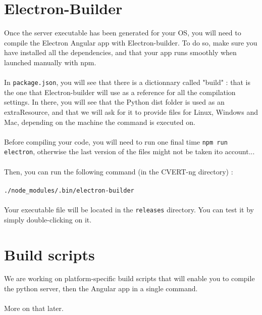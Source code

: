 \documentclass[12pt,a4paper]{article}
\begin{document}
\section{Electron-Builder}

Once the server executable has been generated for your OS, you will need to compile the Electron Angular app with Electron-builder. To do so, make sure you have installed all the dependencies, and that your app runs smoothly when launched manually with npm.\\
~\\
In \texttt{package.json}, you will see that there is a dictionnary called "build" : that is the one that Electron-builder will use as a reference for all the compilation settings. In there, you will see that the Python dist folder is used as an extraResource, and that we will ask for it to provide files for Linux, Windows and Mac, depending on the machine the command is executed on.\\
~\\
Before compiling your code, you will need to run one final time \texttt{npm run electron}, otherwise the last version of the files might not be taken ito account...\\
~\\
Then, you can run the following command (in the CVERT-ng directory) :\\
~\\
\texttt{./node\_modules/.bin/electron-builder}\\
~\\
Your executable file will be located in the \texttt{releases} directory. You can test it by simply double-clicking on it.

\section{Build scripts}

We are working on platform-specific build scripts that will enable you to compile the python server, then the Angular app in a single command.\\
~\\
More on that later.
\end{document}
